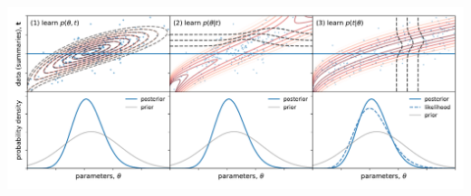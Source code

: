 \documentclass[aspectratio=169]{beamer}
\begin{document}
\begin{frame}
\begin{columns}
        \includegraphics[width=\textwidth]{figures/three_ways_II.pdf}
    \end{columns}
\end{frame}

\end{document}
